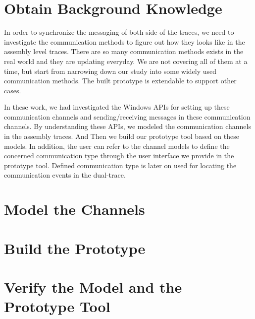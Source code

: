 \section{Obtain Background Knowledge}
In order to synchronize the messaging of both side of the traces, we need to investigate the communication methods to figure out how they looks like in the assembly level traces.
There are so many communication methods exists in the real world and they are updating everyday. We are not covering all of them at a time, but start from narrowing down our study into some widely used communication methods. The built prototype is extendable to support other cases.

In these work, we had investigated the Windows APIs for setting up these communication channels and sending/receiving messages in these communication channels. By understanding these APIs, we modeled the communication channels in the assembly traces. And Then we build our prototype tool based on these models. In addition, the user can refer to the channel models to define the concerned communication type through the user interface we provide in the prototype tool. Defined communication type is later on used for locating the communication events in the dual-trace.  

\section{Model the Channels}

\section{Build the Prototype}

\section{Verify the Model and the Prototype Tool}


\setlength{\unitlength}{\savedunitlength}
